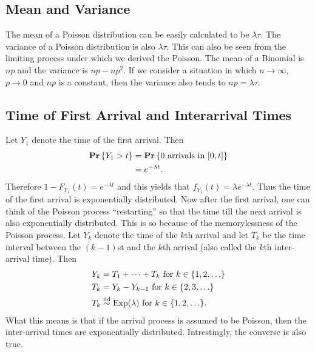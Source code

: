 \subsection{Mean and Variance}
The mean of a Poisson distribution can be easily calculated to be $\lambda \tau$. The variance of a Poisson distribution is also $\lambda \tau$.
This can also be seen from the limiting process under which we derived the Poisson. The mean of a Binomial is $np$ and the variance is $np - np^2$.
If we consider a situation in which $n \to \infty$, $p \to 0$ and $np$ is a constant, then the variance also tends to $np = \lambda \tau$.

\subsection{Time of First Arrival and Interarrival Times}
Let $Y_1$ denote the time of the first arrival. Then
\begin{align*}
    \mathbf{Pr} \left \{ Y_1 > t \right \} & = \mathbf{Pr} \left \{ 0 \text{ arrivals in } [0, t] \right \} \\
                    & = e^{-\lambda t}.
\end{align*}
Therefore $1 - F_{Y_1}(t) =  e^{- \lambda t}$ and this yields that $f_{Y_1}(t) = \lambda e^{-\lambda t}$. Thus the time of the first
arrival is exponentially distributed. Now after the first arrival, one can think of the Poisson process ``restarting'' so that the
time till the next arrival is also exponentially distributed. This is so because of the memorylessness of the Poisson process.
Let $Y_k$ denote the time of the $k$th arrival and let $T_k$ be the time interval between the $(k - 1)$st and the $k$th arrival
(also called the $k$th inter-arrival time). Then
\begin{align*}
    Y_k & = T_1 + \cdots + T_k  \text{ for } k \in \{1, 2, \ldots\} \\
    T_k & = Y_k - Y_{k - 1} \text{ for } k \in \{2, 3, \ldots\} \\
    T_k & \stackrel{\text{iid}}{\sim} \text{Exp}(\lambda) \text{ for } k \in \{1, 2, \ldots\}.
\end{align*}
What this means is that if the arrival process is assumed to be Poisson, then the inter-arrival times are exponentially distributed.
Intrestingly, the converse is also true.

